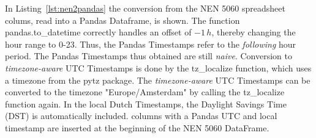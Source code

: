In Listing~\ref{lst:nen2pandas} the conversion from the NEN 5060 spreadsheet colums, read into a Pandas Dataframe, is shown. The function \textsf{pandas.to\_datetime} correctly handles an offset of $-1\, h$, thereby changing the hour range to 0-23. Thus, the Pandas Timestamps refer to the \emph{following} hour period.
The Pandas Timestamps thus obtained are still \emph{naive}. Conversion to \emph{timezone-aware} UTC Timestamps is done by the \textsf{tz\_localize} function, which uses a timezone from the \textsf{pytz} package. The \emph{timezone-aware} UTC Timestamps can be converted to the timezone "Europe/Amsterdam" by calling the \textsf{tz\_localize} function again. In the local Dutch Timestamps, the Daylight Savings Time (DST) is automatically included. columns with a Pandas UTC and local timestamp are inserted at the beginning of the NEN 5060 DataFrame.

